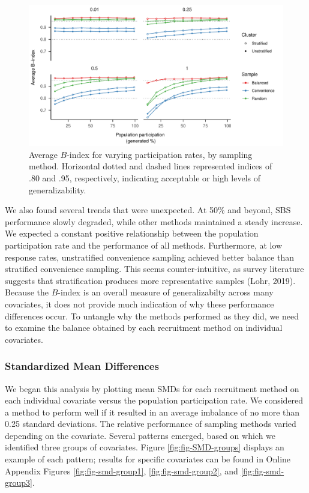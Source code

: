 \documentclass[
  english,
  man,floatsintext]{apa6}
\begin{document}
\begin{figure}
\centering
\includegraphics{6---Paper_files/figure-latex/fig-avg-B-1.pdf}
\caption{\label{fig:fig-avg-B}Average \(B\)-index for varying participation rates, by sampling method. Horizontal dotted and dashed lines represented indices of .80 and .95, respectively, indicating acceptable or high levels of generalizability.}
\end{figure}

We also found several trends that were unexpected. At 50\% and beyond, SBS performance slowly degraded, while other methods maintained a steady increase. We expected a constant positive relationship between the population participation rate and the performance of all methods. Furthermore, at low response rates, unstratified convenience sampling achieved better balance than stratified convenience sampling. This seems counter-intuitive, as survey literature suggests that stratification produces more representative samples (Lohr, 2019). Because the \(B\)-index is an overall measure of generalizabilty across many covariates, it does not provide much indication of why these performance differences occur. To untangle why the methods performed as they did, we need to examine the balance obtained by each recruitment method on individual covariates.

\hypertarget{standardized-mean-differences}{%
\subsubsection{Standardized Mean Differences}\label{standardized-mean-differences}}

We began this analysis by plotting mean SMDs for each recruitment method on each individual covariate versus the population participation rate. We considered a method to perform well if it resulted in an average imbalance of no more than 0.25 standard deviations. The relative performance of sampling methods varied depending on the covariate. Several patterns emerged, based on which we identified three groups of covariates. Figure \ref{fig:fig-SMD-groups} displays an example of each pattern; results for specific covariates can be found in Online Appendix Figures \ref{fig:fig-smd-group1}, \ref{fig:fig-smd-group2}, and \ref{fig:fig-smd-group3}.
\end{document}
